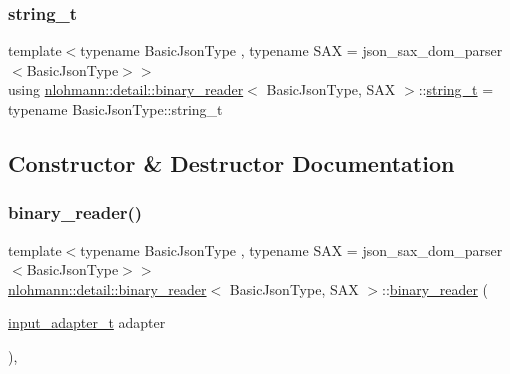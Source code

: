 \mbox{\label{classnlohmann_1_1detail_1_1binary__reader_aa0b9729917ca7ee6ed01e3792341316e}} 
\subsubsection{\texorpdfstring{string\+\_\+t}{string\_t}}
{\footnotesize\ttfamily template$<$typename Basic\+Json\+Type , typename S\+AX  = json\+\_\+sax\+\_\+dom\+\_\+parser$<$\+Basic\+Json\+Type$>$$>$ \\
using \hyperlink{classnlohmann_1_1detail_1_1binary__reader}{nlohmann\+::detail\+::binary\+\_\+reader}$<$ Basic\+Json\+Type, S\+AX $>$\+::\hyperlink{classnlohmann_1_1detail_1_1binary__reader_aa0b9729917ca7ee6ed01e3792341316e}{string\+\_\+t} =  typename Basic\+Json\+Type\+::string\+\_\+t\hspace{0.3cm}{\ttfamily [private]}}



\subsection{Constructor \& Destructor Documentation}
\mbox{\label{classnlohmann_1_1detail_1_1binary__reader_aed84f0302eb232d3b69f7653bef2337a}} 
\subsubsection{\texorpdfstring{binary\+\_\+reader()}{binary\_reader()}\hspace{0.1cm}{\footnotesize\ttfamily [1/3]}}
{\footnotesize\ttfamily template$<$typename Basic\+Json\+Type , typename S\+AX  = json\+\_\+sax\+\_\+dom\+\_\+parser$<$\+Basic\+Json\+Type$>$$>$ \\
\hyperlink{classnlohmann_1_1detail_1_1binary__reader}{nlohmann\+::detail\+::binary\+\_\+reader}$<$ Basic\+Json\+Type, S\+AX $>$\+::\hyperlink{classnlohmann_1_1detail_1_1binary__reader}{binary\+\_\+reader} (\begin{DoxyParamCaption}\item[{\hyperlink{namespacenlohmann_1_1detail_ae132f8cd5bb24c5e9b40ad0eafedf1c2}{input\+\_\+adapter\+\_\+t}}]{adapter }\end{DoxyParamCaption})\hspace{0.3cm}{\ttfamily [inline]}, {\ttfamily [explicit]}}



